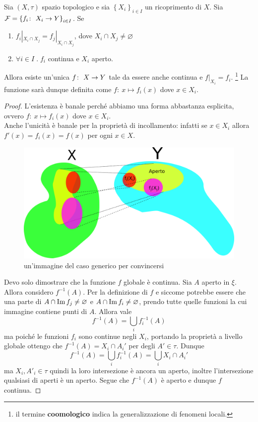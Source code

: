 \begin{theorem}
	Sia $(X,\tau)$ spazio topologico e sia $\left\{X_i\right\}_{i \in I}$ un ricoprimento di $X$. Sia $\mathcal{F} = \left\{ f_i \colon\ X_i \rightarrow Y\right\}_{i \in I}$. Se 
	\begin{enumerate}
		\item $f_i|_{X_i \cap X_j} = f_j|_{X_i \cap X_j}$, dove $X_i \cap X_j \neq \varnothing$
		\item $\forall i \in I \; . \; f_i$ continua e $X_i$ aperto.
	\end{enumerate}
	Allora esiste un'unica $f \colon\ X \rightarrow Y$ tale da essere anche continua e $f|_{X_i} = f_i$. \footnote{il termine \textbf{coomologico} indica la generalizzazione di fenomeni locali.}
	La funzione sarà dunque definita come $f \colon\ x \mapsto f_i(x)$ dove $x \in X_i$.
\end{theorem}
\begin{proof}
	L'esistenza è banale perché abbiamo una forma abbastanza esplicita, ovvero $f \colon\ x \mapsto f_i(x)$ dove $x \in X_i$. \\ Anche l'unicità è banale per la proprietà di incollamento: infatti se $x \in X_i$ allora $f'(x) = f_i(x) = f(x)$ per ogni $x \in X$.
	
	\begin{figure}[h!]
		\centering
		\includegraphics[width=0.6\linewidth]{images/topologia_generale/Coomology_exercises_figure}
		\caption{un'immagine del caso generico per convincersi}
		\label{fig:coomologyexercisesfigure}
	\end{figure}
	Devo solo dimostrare che la funzione $f$ globale è continua.
	Sia $A$ aperto in $\xi$. Allora considero $f^{-1}(A)$. Per la definizione di $f$ e siccome potrebbe essere che una parte di $A \cap \operatorname{Im}{f_j} \neq \varnothing$ e $A \cap \operatorname{Im}{f_i} \neq \varnothing$, prendo tutte quelle funzioni la cui immagine contiene punti di $A$. Allora vale 
	\begin{equation*}
		f^{-1}(A) = \bigcup_{i} f_i^{-1}(A) 
	\end{equation*}
	ma poiché le funzioni $f_i$ sono continue negli $X_i$, portando la proprietà a livello globale ottengo che $f^{-1}(A) = X_i \cap A_i'$ per degli $A' \in \tau$. Dunque 
	\begin{equation*}
		f^{-1}(A) = \bigcup_{i} f_i^{-1}(A) = \bigcup_{i} X_i \cap A_i' 
	\end{equation*}
	ma $X_i, A'_i \in \tau$ quindi la loro intersezione è ancora un aperto, inoltre l'intersezione qualsiasi di aperti è un aperto. Segue che $f^{-1}(A)$ è aperto e dunque $f$ continua.
\end{proof}

